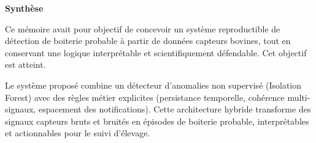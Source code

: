 \begin{conclusion}
\label{chapitre:conclusion}

\newcommand{\conclusionheading}[1]{%
  \par\medskip
  \noindent\textbf{#1}\par\smallskip
}

\conclusionheading{Synthèse}
Ce mémoire avait pour objectif de concevoir un système reproductible de détection de boiterie
probable à partir de données capteurs bovines, tout en conservant une logique interprétable et
scientifiquement défendable. Cet objectif est atteint.

Le système proposé combine un détecteur d'anomalies non supervisé (Isolation Forest) avec des
règles métier explicites (persistance temporelle, cohérence multi-signaux, espacement des
notifications). Cette architecture hybride transforme des signaux capteurs bruts
et bruités en épisodes de boiterie probable, interprétables et actionnables pour le suivi
d'élevage.


\end{conclusion}
